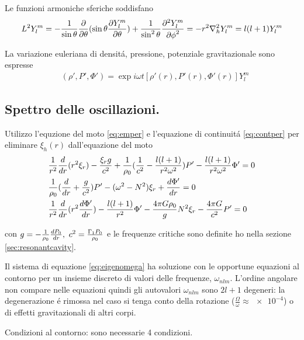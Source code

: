 \documentclass[../main.tex]{subfiles}
\begin{document}
Le funzioni armoniche sferiche  soddisfano
\begin{equation}
L^2Y_l^m=-\frac{1}{\sin{\theta}}\PDof{\theta}(\sin{\theta}\PDy{\theta}{Y_l^m})+\frac{1}{\sin^2{\theta}}\PtwoDy{\phi}{Y_l^m}=-r^2\nabla_h^2Y_l^m=l(l+1)Y_l^m\label{eq:SHperturb}
\end{equation}

La variazione euleriana di densit\'a, pressione, potenziale gravitazionale sono espresse
\begin{align*}
&(\rho',P',\Phi')=\exp{i\omega t}[\rho'(r),P'(r),\Phi'(r)]Y_l^m
\end{align*}


\subsection{Spettro delle oscillazioni.}

Utilizzo l'equzione del moto \eqref{eq:emper} e l'equazione di continuit\'a \eqref{eq:contper} per eliminare $\xi_h(r)$ dall'equazione del moto
\begin{align}
&\frac{1}{r^2}\TDof{r}(r^2\xi_r)-\frac{\xi_rg}{c^2}+\frac{1}{\rho_0}(\frac{1}{c^2}-\frac{l(l+1)}{r^2\omega^2})P'-\frac{l(l+1)}{r^2\omega^2}\Phi'=0\nonumber\\
&\frac{1}{\rho_0}(\TDof{r}+\frac{g}{c^2})P'-(\omega^2-N^2)\xi_r+\TDy{r}{\Phi'}=0\label{eq:eigenomega}\\
&\frac{1}{r^2}\TDof{r}(r^2\TDy{r}{\Phi'})-\frac{l(l+1)}{r^2}\Phi'-\frac{4\pi G\rho_0}{g}N^2\xi_r-\frac{4\pi G}{c^2}P'=0\nonumber
\end{align}

con $g=-\frac{1}{\rho_0}\TDy{r}{P_0},\ c^2=\frac{\Gamma_1P_0}{\rho_0}$ e le frequenze critiche sono definite ho nella sezione \ref{sec:resonantcavity}.


Il sistema di equazione \eqref{eq:eigenomega} ha soluzione con le opportune equazioni al contorno per un insieme discreto di valori delle frequenze, $\omega_{nlm}$. L'ordine angolare non compare nelle equazioni quindi gli autovalori $\omega_{nlm}$ sono $2l+1$ degeneri: la degenerazione \'e rimossa nel caso si tenga conto della rotazione ($\frac{\Omega}{\omega}\approx\num{e-4}$) o di effetti gravitazionali di altri corpi.


Condizioni al contorno: sono necessarie 4 condizioni.
\end{document}
